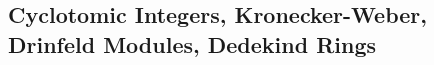 \newpage
\subsection{Cyclotomic Integers, Kronecker-Weber, Drinfeld Modules, Dedekind Rings\label{sec:620_5}}